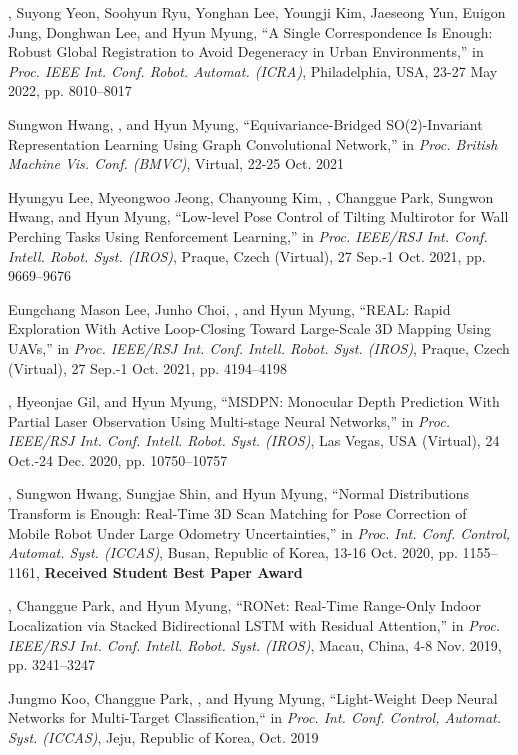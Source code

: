 \begin{pubSubsectionNum}
    \item \hyungtaelim, Suyong Yeon, Soohyun Ryu, Yonghan Lee, Youngji Kim, Jaeseong Yun, Euigon Jung, Donghwan Lee, and Hyun Myung, ``A Single Correspondence Is Enough: Robust Global Registration to Avoid Degeneracy in Urban Environments,'' in \textit{Proc. IEEE Int. Conf. Robot. Automat. (ICRA)}, Philadelphia, USA, 23-27 May 2022, pp. 8010--8017
    \item Sungwon Hwang, \hyungtaelim, and Hyun Myung, ``Equivariance-Bridged SO(2)-Invariant Representation Learning Using Graph Convolutional Network,'' in \textit{Proc. British Machine Vis. Conf. (BMVC)}, Virtual, 22-25 Oct. 2021
    \item Hyungyu Lee, Myeongwoo Jeong, Chanyoung Kim, \hyungtaelim, Changgue Park, Sungwon Hwang, and Hyun Myung, ``Low-level Pose Control of Tilting Multirotor for Wall Perching Tasks Using Renforcement Learning,'' in \textit{Proc. IEEE/RSJ Int. Conf. Intell. Robot. Syst. (IROS)}, Praque, Czech (Virtual), 27 Sep.-1 Oct. 2021, pp. 9669--9676
    \item Eungchang Mason Lee, Junho Choi, \hyungtaelim, and Hyun Myung, ``REAL: Rapid Exploration With Active Loop-Closing Toward Large-Scale 3D Mapping Using UAVs,'' in \textit{Proc. IEEE/RSJ Int. Conf. Intell. Robot. Syst. (IROS)}, Praque, Czech (Virtual), 27 Sep.-1 Oct. 2021, pp. 4194--4198
    \item \hyungtaelim, Hyeonjae Gil, and Hyun Myung, ``MSDPN: Monocular Depth Prediction With Partial Laser Observation Using Multi-stage Neural Networks,'' in \textit{Proc. IEEE/RSJ Int. Conf. Intell. Robot. Syst. (IROS)}, Las Vegas, USA (Virtual), 24 Oct.-24 Dec. 2020, pp. 10750--10757
    \item \hyungtaelim, Sungwon Hwang, Sungjae Shin, and Hyun Myung, ``Normal Distributions Transform is Enough: Real-Time 3D Scan Matching for Pose Correction of Mobile Robot Under Large Odometry Uncertainties,'' in \textit{Proc. Int. Conf. Control, Automat. Syst. (ICCAS)}, Busan, Republic of Korea, 13-16 Oct. 2020, pp. 1155--1161, \textbf{Received Student Best Paper Award}
    \item \hyungtaelim, Changgue Park, and Hyun Myung, ``RONet: Real-Time Range-Only Indoor Localization via Stacked Bidirectional LSTM with Residual Attention,'' in \textit{Proc. IEEE/RSJ Int. Conf. Intell. Robot. Syst. (IROS)}, Macau, China, 4-8 Nov. 2019, pp. 3241--3247
    \item Jungmo Koo, Changgue Park, \hyungtaelim, and Hyung Myung, ``Light-Weight Deep Neural Networks for Multi-Target Classification,`` in \textit{Proc. Int. Conf. Control, Automat. Syst. (ICCAS)}, Jeju, Republic of Korea, Oct. 2019

\end{pubSubsectionNum}
